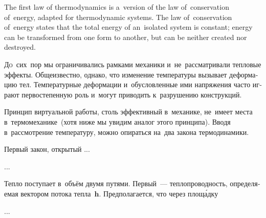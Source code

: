 

\thispagestyle{empty}

\label{chapter:thermoelasticity}



\begin{otherlanguage}{russian}

{\small
The first law of thermodynamics is a~version of the law of~conservation of~energy, adapted for thermodynamic systems. The law of~conservation of~energy states that the total energy of an~isolated system is constant; energy can be transformed from one form to another, but can be neither created nor destroyed.
\par}

\lettrine[lines=2, findent=2pt, nindent=0pt]{Д}{о}~сих~пор мы ограничивались рамками механики и~не~рассматривали тепловые эффекты. Общеизвестно, однако, что изменение температуры вызывает деформацию тел. Температурные деформации и~обусловленные ими напряжения часто играют первостепенную роль и~могут приводить к~разрушению конструкций.

Принцип виртуальной работы, столь эффективный в~механике, не~имеет места в~термо\-механике~(хотя ниже мы увидим аналог этого принципа). Вводя в~рассмотрение температуру, можно опираться на~два закона термодинамики.

Первый закон, открытый ...

...

Тепло поступает в~объём двумя путями. Первый~--- теплопроводность, определяемая вектором потока тепла~$\bm{h}$. Предполагается, что через площ\'{а}дку

...



\end{otherlanguage}

